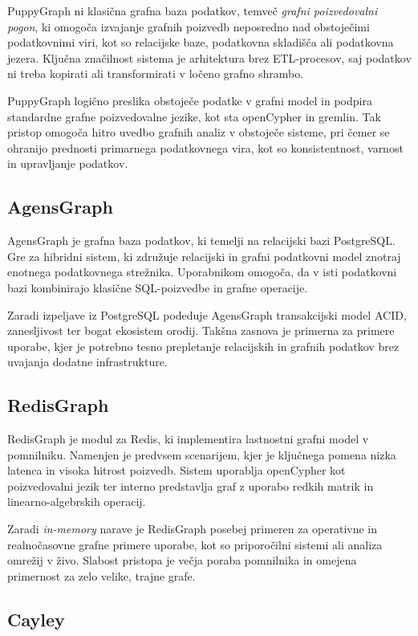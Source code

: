 \documentclass[a4paper,12pt,openright]{book}
\begin{document}
PuppyGraph ni klasična grafna baza podatkov, temveč \emph{grafni poizvedovalni pogon}, ki omogoča izvajanje grafnih poizvedb neposredno nad obstoječimi podatkovnimi viri, kot so relacijske baze, podatkovna skladišča ali podatkovna jezera. Ključna značilnost sistema je arhitektura brez ETL-procesov, saj podatkov ni treba kopirati ali transformirati v ločeno grafno shrambo.

PuppyGraph logično preslika obstoječe podatke v grafni model in podpira standardne grafne poizvedovalne jezike, kot sta openCypher in gremlin. Tak pristop omogoča hitro uvedbo grafnih analiz v obstoječe sisteme, pri čemer se ohranijo prednosti primarnega podatkovnega vira, kot so konsistentnost, varnost in upravljanje podatkov.

\subsection{AgensGraph}

AgensGraph je grafna baza podatkov, ki temelji na relacijski bazi PostgreSQL. Gre za hibridni sistem, ki združuje relacijski in grafni podatkovni model znotraj enotnega podatkovnega strežnika. Uporabnikom omogoča, da v isti podatkovni bazi kombinirajo klasične SQL-poizvedbe in grafne operacije.

Zaradi izpeljave iz PostgreSQL podeduje AgensGraph transakcijski model ACID, zanesljivost ter bogat ekosistem orodij. Takšna zasnova je primerna za primere uporabe, kjer je potrebno tesno prepletanje relacijskih in grafnih podatkov brez uvajanja dodatne infrastrukture.

\subsection{RedisGraph}

RedisGraph je modul za Redis, ki implementira lastnostni grafni model v pomnilniku. Namenjen je predvsem scenarijem, kjer je ključnega pomena nizka latenca in visoka hitrost poizvedb. Sistem uporablja openCypher kot poizvedovalni jezik ter interno predstavlja graf z uporabo redkih matrik in linearno-algebrskih operacij.

Zaradi \textit{in-memory} narave je RedisGraph posebej primeren za operativne in realnočasovne grafne primere uporabe, kot so priporočilni sistemi ali analiza omrežij v živo. Slabost pristopa je večja poraba pomnilnika in omejena primernost za zelo velike, trajne grafe.

\subsection{Cayley}
\end{document}
